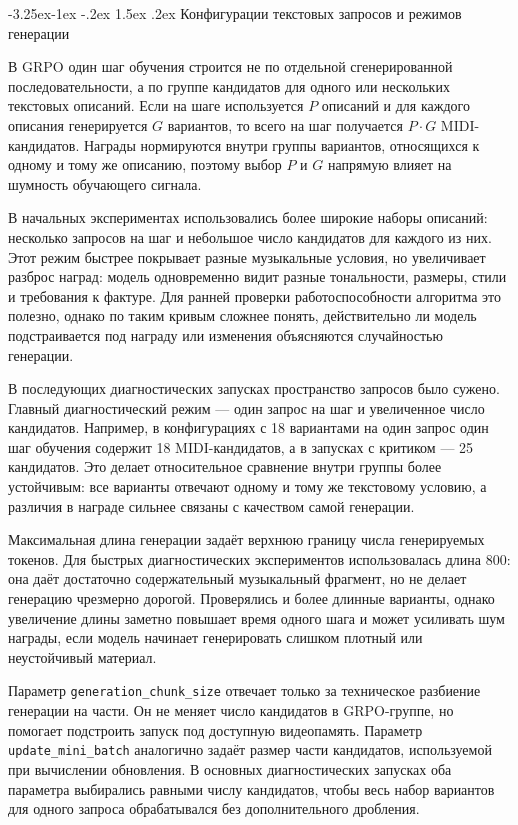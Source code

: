 \documentclass[a4paper,12pt]{extarticle}
\makeatletter
\renewcommand\subsection{\@startsection{subsection}{2}{\z@}%
  {-3.25ex\@plus -1ex \@minus -.2ex}%
  {1.5ex \@plus .2ex}%
  {\normalfont\large\bfseries\Needspace{6\baselineskip}}}
\makeatother
\begin{document}
\subsection{Конфигурации текстовых запросов и режимов генерации}

В GRPO один шаг обучения строится не по отдельной сгенерированной
последовательности, а по группе кандидатов для одного или нескольких
текстовых описаний. Если на шаге используется $P$ описаний и для каждого
описания генерируется $G$ вариантов, то всего на шаг получается
$P \cdot G$ MIDI-кандидатов. Награды нормируются внутри группы вариантов,
относящихся к одному и тому же описанию, поэтому выбор $P$ и $G$ напрямую
влияет на шумность обучающего сигнала.

В начальных экспериментах использовались более широкие наборы описаний:
несколько запросов на шаг и небольшое число кандидатов для каждого
из них. Этот режим быстрее покрывает разные музыкальные условия, но
увеличивает разброс наград: модель одновременно видит разные тональности,
размеры, стили и требования к фактуре. Для ранней проверки работоспособности
алгоритма это полезно, однако по таким кривым сложнее понять, действительно
ли модель подстраивается под награду или изменения объясняются случайностью
генерации.

В последующих диагностических запусках пространство запросов было
сужено. Главный диагностический режим --- один запрос на шаг и увеличенное число
кандидатов. Например, в конфигурациях с 18 вариантами на один запрос один
шаг обучения содержит 18 MIDI-кандидатов, а в запусках с критиком ---
25 кандидатов. Это делает относительное сравнение
внутри группы более устойчивым: все варианты отвечают одному и тому же
текстовому условию, а различия в награде сильнее связаны с качеством самой
генерации.

Максимальная длина генерации задаёт верхнюю границу числа генерируемых
токенов. Для быстрых диагностических экспериментов использовалась длина 800:
она даёт достаточно содержательный музыкальный фрагмент, но
не делает генерацию чрезмерно дорогой. Проверялись и более длинные
варианты, однако увеличение длины заметно повышает время одного шага и может
усиливать шум награды, если модель начинает генерировать слишком плотный или
неустойчивый материал.

Параметр \texttt{generation\_chunk\_size} отвечает только за техническое
разбиение генерации на части. Он не меняет число кандидатов в GRPO-группе, но
помогает подстроить запуск под доступную видеопамять. Параметр
\texttt{update\_mini\_batch} аналогично задаёт размер части кандидатов,
используемой при вычислении обновления. В основных диагностических запусках
оба параметра выбирались равными числу кандидатов, чтобы весь набор
вариантов для одного запроса обрабатывался без дополнительного дробления.
\end{document}
